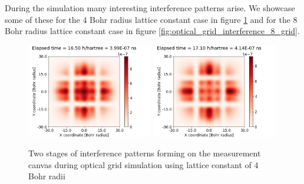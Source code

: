 During the simulation many interesting interference patterns arise.
We showcase some of these for the $4$ Bohr radius lattice constant case in figure \ref{fig:optical_grid_interference} and for the $8$ Bohr radius lattice constant case in figure \ref{fig:optical_grid_interference_8_grid}.
\begin{figure}
	\begin{center}
		\includegraphics[width=0.49\textwidth]{figures/optical_grid_interference_01.png}
		\includegraphics[width=0.49\textwidth]{figures/optical_grid_interference_02.png}
		\caption{Two stages of interference patterns forming on the measurement canvas during optical grid simulation using lattice constant of $4$ Bohr radii}
		\label{fig:optical_grid_interference}
	\end{center}	
\end{figure}

